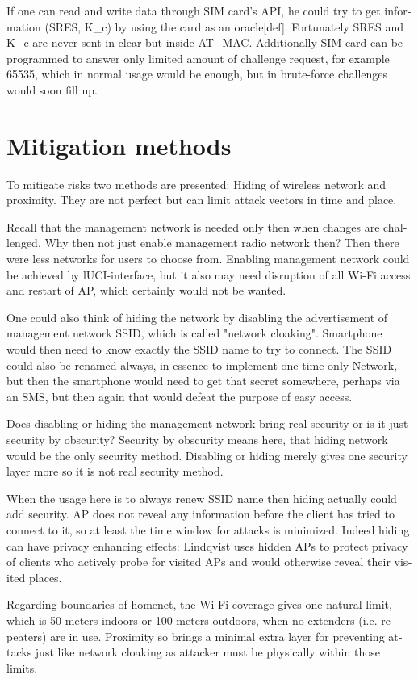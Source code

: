 \documentclass[12pt,a4paper,english]{tutthesis}
\begin{document}
\begin{otherlanguage}{english}
If one can read and write data through SIM card's API,
he could try to get information (SRES, K\_c) by using the card as an
oracle[def]. Fortunately SRES and K\_c are never sent in clear but
inside AT\_MAC. Additionally SIM card can be programmed to answer only
limited amount of challenge request, for example 65535, which in
normal usage would be enough, but in brute-force challenges 
would soon fill up.


\section{Mitigation methods}
\label{sec-6-8}
To mitigate risks two methods are presented: Hiding of
wireless network and proximity. They are not perfect but can
limit attack vectors in time and place.

Recall that the management network is needed only then when changes
are challenged. Why then not just enable management radio network
then? Then there were less networks for users to choose from.
Enabling management network could be achieved by lUCI-interface, but
it also may need disruption of all Wi-Fi access and restart of AP,
which certainly would not be wanted.  

\label{tag:hidessid}
One could also think of hiding the network by disabling the
advertisement of management network SSID, which is called "network
cloaking".  Smartphone would then need to know exactly the SSID name
to try to connect. The SSID could also be renamed always, in essence
to implement one-time-only Network, but then the smartphone would
need to get that secret somewhere, perhaps via an SMS, but then again
that would defeat the purpose of easy access.

Does disabling or hiding the management network bring real security or
is it just security by obscurity?  Security by obscurity means here,
that hiding network would be the only security method.
Disabling or hiding  merely gives one security layer more so it is not
real security method.

When the usage here is to always renew SSID name then
hiding actually could add security. AP does not reveal any information
before the client has tried to connect to it, so at least 
the time window for attacks is minimized. Indeed hiding can have
privacy enhancing effects: Lindqvist\cite{hidden-wlan} uses hidden APs
to protect privacy of clients who actively probe for visited APs and
would otherwise reveal their visited places.


Regarding boundaries of homenet, the Wi-Fi coverage gives 
one natural limit, which is 50 meters indoors or 100 meters outdoors,
when no extenders (i.e. repeaters) are in use.
Proximity so brings a minimal extra layer for preventing attacks
just like network cloaking as attacker must be physically within those limits.


\end{otherlanguage}
\end{document}
